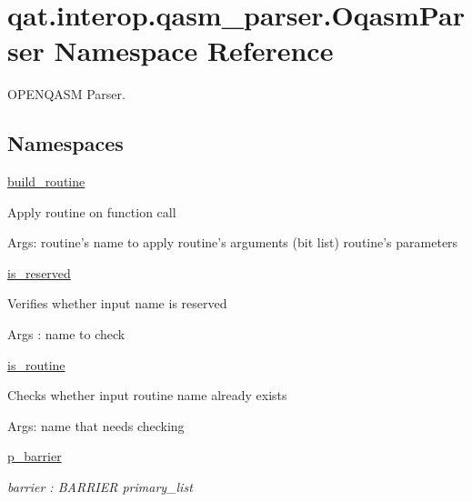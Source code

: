 \hypertarget{namespaceqat_1_1interop_1_1qasm__parser_1_1OqasmParser}{\section{qat.\-interop.\-qasm\-\_\-parser.\-Oqasm\-Parser Namespace Reference}
\label{namespaceqat_1_1interop_1_1qasm__parser_1_1OqasmParser}
}


O\-P\-E\-N\-Q\-A\-S\-M Parser.  


\subsection*{Namespaces}
\begin{DoxyCompactItemize}
\item 
\hyperlink{namespaceqat_1_1interop_1_1qasm__parser_1_1OqasmParser_1_1build__routine}{build\-\_\-routine}
\begin{DoxyCompactList}\small\item\em \begin{DoxyVerb}Apply routine on function call
\end{DoxyVerb}
 Args\-: routine's name to apply routine's arguments (bit list) routine's parameters \end{DoxyCompactList}\item 
\hyperlink{namespaceqat_1_1interop_1_1qasm__parser_1_1OqasmParser_1_1is__reserved}{is\-\_\-reserved}
\begin{DoxyCompactList}\small\item\em \begin{DoxyVerb}Verifies whether input name is reserved
\end{DoxyVerb}
 Args \-: name to check \end{DoxyCompactList}\item 
\hyperlink{namespaceqat_1_1interop_1_1qasm__parser_1_1OqasmParser_1_1is__routine}{is\-\_\-routine}
\begin{DoxyCompactList}\small\item\em \begin{DoxyVerb}Checks whether input routine name already exists
\end{DoxyVerb}
 Args\-: name that needs checking \end{DoxyCompactList}\item 
\hyperlink{namespaceqat_1_1interop_1_1qasm__parser_1_1OqasmParser_1_1p__barrier}{p\-\_\-barrier}
\begin{DoxyCompactList}\small\item\em barrier \-: B\-A\-R\-R\-I\-E\-R primary\-\_\-list \end{DoxyCompactList}\item 

\end{DoxyCompactItemize}
